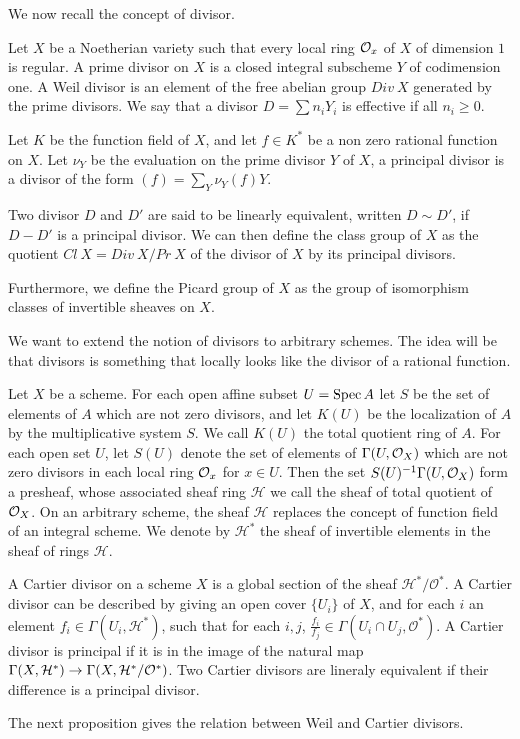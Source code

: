 \documentclass[
	oldfontcommands,
	sumario=abnt-6027-2012,
	12pt,			%
	openright,		%
	oneside,		%
	a4paper,		%
	english,		%
	brazil			%
	]{imecc-unicamp}
\begin{document}
We now recall the concept of divisor.

\begin{definition}
	Let $X$ be a Noetherian variety such that every local ring ${\mathcal O}_x$ of $X$ of dimension $1$ is regular. A prime divisor on $X$ is a closed integral subscheme $Y$ of codimension one. A Weil divisor is an element of the free abelian group $Div~X$ generated by the prime divisors. We say that a divisor $D=\sum n_iY_i$ is effective if all $n_i\geq0$.
	
	Let $K$ be the function field of $X$, and let $f\in K^*$ be a non zero rational function on $X$. Let $\nu_Y$ be the evaluation on the prime divisor $Y$ of $X$, a principal divisor is a divisor of the form $(f)=\sum_{Y} \nu_Y(f)Y$.
	
	Two divisor $D$ and $D'$ are said to be linearly equivalent, written $D\sim D'$, if $D-D'$ is a principal divisor. We can then define the class group of $X$ as the quotient $Cl~X=Div~X/Pr~X$ of the divisor of $X$ by its principal divisors. 
	
	Furthermore, we define the Picard group of $X$ as the group of isomorphism classes of invertible sheaves on $X$.
	
	
\end{definition}

We want to extend the notion of divisors to arbitrary schemes. The idea will be that divisors is something that locally looks like the divisor of a rational function.

\begin{definition}
	Let $X$ be a scheme. For each open affine subset $U=\operatorname{Spec} A$ let $S$ be the set of elements of $A$ which are not zero divisors, and let $K(U)$ be the localization of $A$ by the multiplicative system $S$. We call $K(U)$ the total quotient ring of $A$. For each open set $U$, let $S(U)$ denote the set of elements of $\Gamma(U,{\mathcal O}_X)$ which are not zero divisors in each local ring ${\mathcal O}_x$ for $x\in U$. Then the set $S(U)^{-1}\Gamma(U,{\mathcal O}_X)$ form a presheaf, whose associated sheaf ring $\mathcal H$ we call the sheaf of total quotient of ${\mathcal O}_X$. On an arbitrary scheme, the sheaf $\mathcal H$ replaces the concept of function field of an integral scheme. We denote by $\mathcal H^*$ the sheaf of invertible elements in the sheaf of rings $\mathcal H$.
\end{definition}
\begin{definition}
	A Cartier divisor on a scheme $X$ is a global section of the sheaf $\mathcal H^*/\mathcal O^*$. A Cartier divisor can be described by giving an open cover $\{U_i\}$ of $X$, and for each $i$ an element $f_i\in\Gamma(U_i,\mathcal H^*)$, such that for each $i,j$, $\frac{f_i}{f_j}\in\Gamma(U_i\cap U_j,\mathcal O^*)$. A Cartier divisor is principal if it is in the image of the natural map $\Gamma(X,\mathcal H^*)\rightarrow \Gamma(X,\mathcal H^*/{\mathcal O}^*)$. Two Cartier divisors are lineraly equivalent if their difference is a principal divisor.
	
	
\end{definition}
The next proposition gives the relation between Weil and Cartier divisors.
\end{document}
